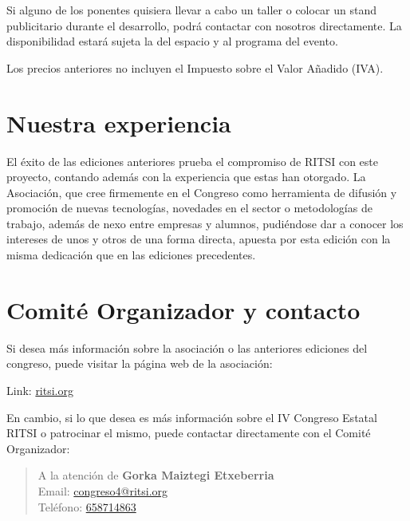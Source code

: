 \documentclass[11pt]{ritsi/article}
\begin{document}
Si alguno de los ponentes quisiera llevar a cabo un taller o colocar un stand publicitario durante el desarrollo, podrá contactar con nosotros directamente. La disponibilidad estará sujeta la del espacio y al programa del evento.

Los precios anteriores no incluyen el Impuesto sobre el Valor Añadido (IVA).

\section{Nuestra experiencia}
El éxito de las ediciones anteriores prueba el compromiso de RITSI con este proyecto, contando además con la experiencia que estas han otorgado. La Asociación, que cree firmemente en el Congreso como herramienta de difusión y promoción de nuevas tecnologías, novedades en el sector o metodologías de trabajo, además de nexo entre empresas y alumnos, pudiéndose dar a conocer los intereses de unos y otros de una forma directa, apuesta por esta edición con la misma dedicación que en las ediciones precedentes.

\section{Comité Organizador y contacto}
Si desea más información sobre la asociación o las anteriores ediciones del congreso, puede visitar la página web de la asociación:

\indent Link: \href{http://www.ritsi.org}{ritsi.org}

En cambio, si lo que desea es más información sobre el IV Congreso Estatal RITSI o patrocinar el mismo, puede contactar directamente con el Comité Organizador:

\begin{quotation}
\noindent A la atención de \textbf{Gorka Maiztegi Etxeberria} \\
Email: \href{mailto:congreso4@ritsi.org}{congreso4@ritsi.org} \\
Teléfono: \href{tel:658714863}{658714863}
\end{quotation}
\end{document}
